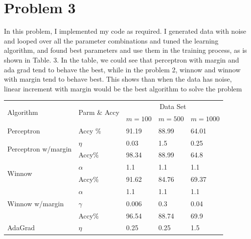 \section{Problem 3}
In this problem, I implemented my code as required. I generated data with noise and looped over all the parameter combinations and tuned the learning algorithm, and found best parameters and use them in the training process, as is shown in Table. 3. In the table, we could see that perceptron with margin and ada grad tend to behave the best, while in the problem 2, winnow and winnow with margin tend to behave best. This shows than when the data has noise, linear increment with margin would be the best algorithm to solve the problem
\begin{center}
	\begin{table}
		\begin{tabular}{|p{4.3cm}<{\centering}|p{2.5cm}<{\centering}|p{2.7cm}<{\centering}|p{2.7cm}<{\centering}|p{2.7cm}<{\centering}|}
			\hline
			\multirow{2}{*}{Algorithm} & \multirow{2}{*}{Parm \& Accy} & \multicolumn{3}{|c|}{Data Set} \\
			\cline{3-5}
			& & $m=100$& $m=500$& $m=1000$\\
			\hline
			Perceptron    & Accy \%               &            91.19                 &  88.99 &             64.01                  \\ \hline
			\multirow{2}{*}{Perceptron w/margin} &          $\eta$          &         0.03          &    1.5 &            0.25                   \\
			\cline{2-5}
			& Accy\% &  98.34& 88.99& 64.8\\ \hline \hline
			\multirow{2}{*}{Winnow}               &     $\alpha$           &      1.1               &     1.1    &         1.1                  \\
			\cline{2-5}
			& Accy\% &  91.62& 84.76 & 69.37\\ \hline \hline
			\multirow{3}{*}{Winnow w/margin}     & $\alpha$&             1.1                        &    1.1 &   1.1             \\
			\cline{2-5}
			& $\gamma$ &  0.006& 0.3& 0.04\\
			\cline{2-5}
			& Accy\% &  96.54& 88.74& 69.9\\ \hline \hline
			\multirow{2}{*}{AdaGrad}             & $\eta$&                 0.25                     &       0.25        &     1.5                \\

\end{tabular}
\end{table}
\end{center}
